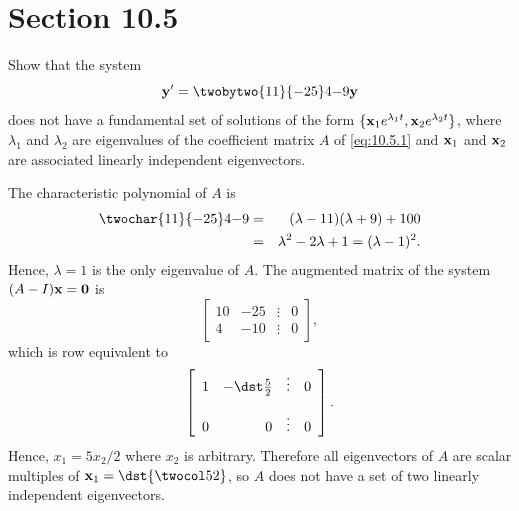 \section*{Section 10.5}
\setcounter{chapter}{10}
\setcounter{section}{5}

\setcounter{example}{0}
\setcounter{equation}{0}
\begin{example}
  \label{example:10.5.1}\rm \space Show that the system
  \begin{equation}
    \label{eq:10.5.1}{\bf y}'=\twobytwo{11}{-25}4{-9}{\bf y}
  \end{equation}
  does not have a fundamental set of solutions of the form
  $\{{\bf x}_{1}e^{\lambda_{1}t},{\bf x}_{2}e^{\lambda_{2}t}\}$, where $\lambda_{1}$ and
  $\lambda_{2}$ are eigenvalues of the coefficient matrix $A$ of \eqref{eq:10.5.1} and
  ${\bf x}_{1}$ and ${\bf x}_{2}$ are associated linearly independent eigenvectors.
\end{example}
\begin{examplesolution}
\solution The characteristic polynomial of $A$ is
\begin{eqnarray*}
  \twochar{11}{-25}4{-9} & = & (\lambda-11)(\lambda+9)+100 \\
                         & = & \lambda^{2}-2\lambda+1=(\lambda-1)^{2}.
\end{eqnarray*}
Hence, $\lambda=1$ is the only eigenvalue of $A$. The augmented matrix of the system
$(A-I){\bf x}={\bf0}$ is
\[
  \left[
  \begin{array}{rrcr}
    10 & -25 & \vdots & 0 \\
    4  & -10 & \vdots & 0
  \end{array}\right],
\]
which is row equivalent to
\[
  \left[
  \begin{array}{rrcr}
    1 & -\dst\frac{5}{2} & \vdots & 0 \\[10pt]
    0 & 0                & \vdots & 0
  \end{array}\right].
\]
Hence, $x_{1}=5x_{2}/2$ where $x_{2}$ is arbitrary. Therefore all eigenvectors of $A$ are scalar
multiples of ${\bf x}_{1}=\dst{\twocol52}$, so $A$ does not have a set of two linearly independent
eigenvectors. \bbox
\end{examplesolution}

